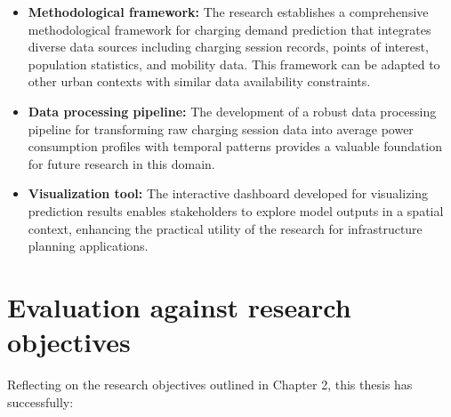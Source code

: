 \begin{itemize}
    \item \textbf{Methodological framework:} The research establishes a comprehensive methodological framework for charging demand prediction that integrates diverse data sources including charging session records, points of interest, population statistics, and mobility data. This framework can be adapted to other urban contexts with similar data availability constraints.

    \item \textbf{Data processing pipeline:} The development of a robust data processing pipeline for transforming raw charging session data into average power consumption profiles with temporal patterns provides a valuable foundation for future research in this domain.

    \item \textbf{Visualization tool:} The interactive dashboard developed for visualizing prediction results enables stakeholders to explore model outputs in a spatial context, enhancing the practical utility of the research for infrastructure planning applications.
\end{itemize}

\section{Evaluation against research objectives}

Reflecting on the research objectives outlined in Chapter 2, this thesis has successfully:

